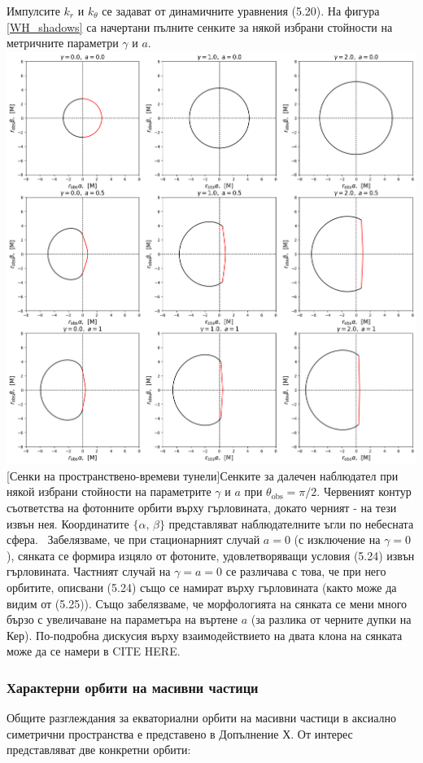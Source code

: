 Импулсите $k_r$ и $k_\theta$ се задават от динамичните уравнения (5.20). На фигура \ref{WH_shadows} са начертани пълните сенките за някой избрани стойности на метричните параметри $\gamma$ и $a$.\\

\includegraphics[scale = 0.37]{WH_Shadows.png}
[Сенки на пространствено-времеви тунели]{\small Сенките за далечен наблюдател при някой избрани стойности на параметрите $\gamma$ и $a$ при $\theta_\text{obs} = \pi / 2$. Червеният контур съответства на фотонните орбити върху гърловината, докато черният - на тези извън нея. Координатите $\{\alpha,\,\beta\}$ представляват наблюдателните ъгли по небесната сфера.}
\label{WH_shadows}
$\,$
\newline
Забелязваме, че при стационарният случай $a = 0$ (с изключение на $\gamma = 0$), сянката се формира изцяло от фотоните, удовлетворяващи условия (5.24) извън гърловината. Частният случай на $\gamma = a = 0$ се различава с това, че при него орбитите, описвани (5.24) също се намират върху гърловината (както може да видим от (5.25)). Също забелязваме, че морфологията на сянката се мени много бързо с увеличаване на параметъра на въртене $a$ (за разлика от черните дупки на Кер). По-подробна дискусия върху взаимодействието на двата клона на сянката може да се намери в CITE HERE.
\newpage
\subsubsection{Характерни орбити на масивни частици}
Общите разглеждания за екваториални орбити на масивни частици в аксиално симетрични пространства е представено в Допълнение Х. От интерес представляват две конкретни орбити:\\

